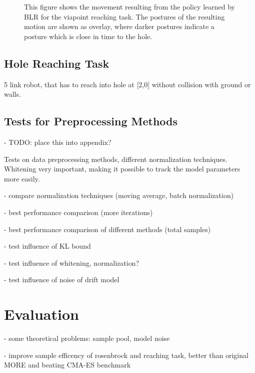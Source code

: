 \begin{figure}[ht!]
  \centering
     
     \hspace{1cm}                       
     \caption{This figure shows the movement resulting from the policy
       learned by BLR for the viapoint reaching task.
       The postures of the resulting motion are shown as overlay,
       where darker postures indicate a posture which
       is close in time to the hole.}
     \label{fig:blr_via}  
\end{figure}

\subsection{Hole Reaching Task}
5 link robot, that has to reach into hole at [2,0] without collision
with ground or walls.

\subsection{Tests for Preprocessing Methods}
- TODO: place this into appendix?

Tests on data preprocessing methods, different normalization techniques.
Whitening very important, making it possible to track the model parameters
more easily.

- compare normalization techniques (moving average, batch normalization)

- best performance comparison (more iterations)

- best performance comparison of different methods (total samples)

- test influence of KL bound

- test influence of whitening, normalization?

- test influence of noise of drift model

\section{Evaluation}
- some theoretical problems: sample pool, model noise

- improve sample efficency of rosenbrock and reaching task,
better than original MORE and beating CMA-ES benchmark

